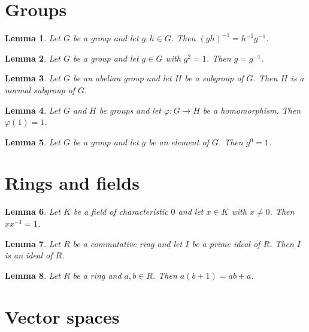\documentclass{article}
\newtheorem{lemma}{Lemma}
\begin{document}

\section{Groups}

\begin{lemma}\label{inverse}
Let $G$ be a group and let $g,h\in G$. Then $(gh)^{-1}=h^{-1}g^{-1}$.
\end{lemma}

\begin{lemma}\label{involution}
Let $G$ be a group and let $g\in G$ with $g^2=1$. Then $g=g^{-1}$.
\end{lemma}

\begin{lemma}\label{normal}
Let $G$ be an abelian group and let $H$ be a subgroup of $G$. Then $H$ is a normal subgroup of $G$.
\end{lemma}

\begin{lemma}\label{hom}
Let $G$ and $H$ be groups and let $\varphi\colon G\to H$ be a homomorphism. Then $\varphi(1)=1$.
\end{lemma}

\begin{lemma}\label{element}
Let $G$ be a group and let $g$ be an element of $G$. Then $g^{0}=1$.
\end{lemma}

\section{Rings and fields}

\begin{lemma}\label{field}
Let $K$ be a field of characteristic $0$ and let $x\in K$ with $x\ne0$. Then $xx^{-1}=1$.
\end{lemma}

\begin{lemma}\label{ideal}
Let $R$ be a commutative ring and let $I$ be a prime ideal of $R$. Then $I$ is an ideal of $R$.
\end{lemma}

\begin{lemma}\label{distributive}
Let $R$ be a ring and $a,b\in R$. Then $a(b+1)=ab+a$.
\end{lemma}

\section{Vector spaces}
\end{document}

